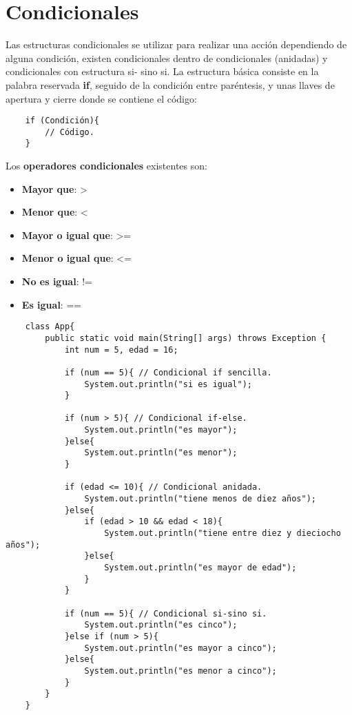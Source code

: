 \section{Condicionales}

Las estructuras condicionales se utilizar para realizar una acción dependiendo de alguna condición, existen condicionales dentro de condicionales (anidadas) y condicionales con estructura si- sino si. La estructura básica consiste en la palabra reservada \textbf{if}, seguido de la condición entre paréntesis, y unas llaves de apertura y cierre donde se contiene el código:
\begin{lstlisting}
    if (Condición){
        // Código.
    }
\end{lstlisting}

Los \textbf{operadores condicionales} existentes son:
\begin{itemize}
    \item \textbf{Mayor que}: >
    \item \textbf{Menor que}: <
    \item \textbf{Mayor o igual que}: >=
    \item \textbf{Menor o igual que}: <=
    \item \textbf{No es igual}: !=
    \item \textbf{Es igual}: ==
\end{itemize}
\begin{lstlisting}
    class App{
        public static void main(String[] args) throws Exception {
            int num = 5, edad = 16;
            
            if (num == 5){ // Condicional if sencilla.
                System.out.println("si es igual");
            }
            
            if (num > 5){ // Condicional if-else.
                System.out.println("es mayor");
            }else{
                System.out.println("es menor");
            }
            
            if (edad <= 10){ // Condicional anidada.
                System.out.println("tiene menos de diez años");
            }else{
                if (edad > 10 && edad < 18){
                    System.out.println("tiene entre diez y dieciocho años");
                }else{
                    System.out.println("es mayor de edad");
                }
            }
            
            if (num == 5){ // Condicional si-sino si.
                System.out.println("es cinco");
            }else if (num > 5){
                System.out.println("es mayor a cinco");
            }else{
                System.out.println("es menor a cinco");
            }
        }
    }
\end{lstlisting}



